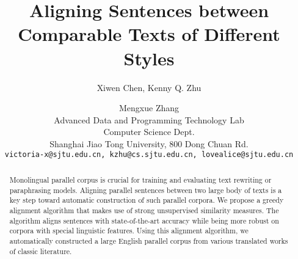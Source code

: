 \documentclass[11pt,a4paper]{article}
\title{Aligning Sentences between Comparable Texts of Different Styles}
\author{Xiwen Chen, Kenny Q. Zhu \and Mengxue Zhang\\
  Advanced Data and Programming Technology Lab \\
  Computer Science Dept. \\
  Shanghai Jiao Tong University, 800 Dong Chuan Rd. \\
  \texttt{victoria-x@sjtu.edu.cn, kzhu@cs.sjtu.edu.cn,  lovealice@sjtu.edu.cn}
}
\date{}
\renewcommand{\;}{;\\}
\begin{document}
\maketitle

\begin{abstract}
Monolingual parallel corpus is crucial for training and evaluating text rewriting or paraphrasing models. Aligning parallel sentences between two large body of texts is a key step toward automatic construction of such parallel corpora. We propose a greedy alignment algorithm that makes use of strong unsupervised similarity measures. The algorithm aligns sentences with state-of-the-art accuracy while being more robust on corpora with special linguistic features. Using this alignment algorithm,  we automatically constructed a large English parallel corpus from various translated works of classic literature.
\end{abstract}









\end{document}
